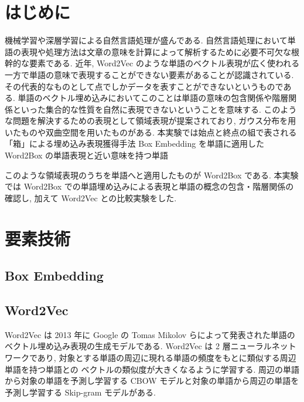 \documentclass[twocolumn]{jarticle}     %
\begin{document}

\section{はじめに}
機械学習や深層学習による自然言語処理が盛んである. 
自然言語処理において単語の表現や処理方法は文章の意味を計算によって解析するために必要不可欠な根幹的な要素である.
近年, Word2Vec のような単語のベクトル表現が広く使われる一方で単語の意味で表現することができない要素があることが認識されている. 
その代表的なものとして点でしかデータを表すことができないというものである. 単語のベクトル埋め込みにおいてこのことは単語の意味の包含関係や階層関係といった集合的な性質を自然に表現できないということを意味する. 
このような問題を解決するための表現として領域表現が提案されており, ガウス分布を用いたものや双曲空間を用いたものがある. 本実験では始点と終点の組で表される「箱」による埋め込み表現獲得手法 Box Embedding を単語に適用した Word2Box の単語表現と近い意味を持つ単語

このような領域表現のうちを単語へと適用したものが Word2Box である. 本実験では Word2Box での単語埋め込みによる表現と単語の概念の包含・階層関係の確認し, 
加えて Word2Vec との比較実験をした.

\section{要素技術}
\subsection{Box Embedding}
\subsection{Word2Vec}
Word2Vec は 2013 年に Google の Tomas Mikolov らによって発表された単語のベクトル埋め込み表現の生成モデルである. 
Word2Vec は 2 層ニューラルネットワークであり, 対象とする単語の周辺に現れる単語の頻度をもとに類似する周辺単語を持つ単語との
ベクトルの類似度が大きくなるように学習する. 周辺の単語から対象の単語を予測し学習する CBOW モデルと対象の単語から周辺の単語を予測し学習する Skip-gram モデルがある.
\end{document}
